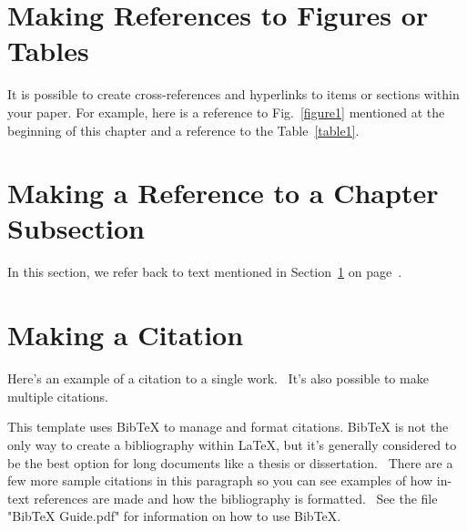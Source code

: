 
\section{Making References to Figures or Tables}
\label{makereference1.1}

It is possible to create cross-references and hyperlinks to items or sections within your paper.  For example, here is a reference to Fig.~\ref{figure1} mentioned at the beginning of this chapter and a reference to the Table~\ref{table1}.

\section{Making a Reference to a Chapter Subsection}
\label{makereference1.2}

In this section, we refer back to text mentioned in
Section~\ref{makereference1.1} on page~\pageref{makereference1.1}.

\section{Making a Citation}
\label{makereference1.3}

Here's an example of a citation to a single work.~\citep{CT:Weiner:1999} It's also possible to make multiple citations.~\citep{CT:Phillips:1985, ARP:Loy:1974}

This template uses BibTeX to manage and format citations.  BibTeX is not the only way to create a bibliography within LaTeX, but it's generally considered to be the best option for long documents like a thesis or dissertation.~\citep{CT:Gould:1988}  There are a few more sample citations in this paragraph so you can see examples of how in-text references are made and how the bibliography is formatted.~\citep{ARP:Melinger:1991} See the file "BibTeX Guide.pdf" for information on how to use BibTeX.

